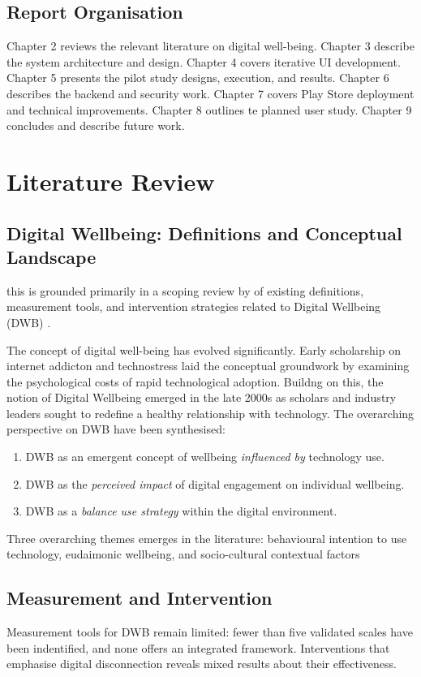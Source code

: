 \documentclass[12pt,a4paper]{report}
\begin{document}
\section{Report Organisation}
Chapter 2 reviews the relevant literature on digital well-being. Chapter 3 describe the system architecture and design. Chapter 4 covers iterative UI development. Chapter 5 presents the pilot study designs, execution, and results. Chapter 6 describes the backend and security work. Chapter 7 covers Play Store deployment and technical improvements. Chapter 8 outlines te planned user study. Chapter 9 concludes and describe future work.

\chapter{Literature Review}
\section{Digital Wellbeing: Definitions and Conceptual Landscape}
this  is grounded primarily in a scoping review by \citep{zhang2022monitoring} of existing definitions, measurement tools, and intervention strategies related to Digital Wellbeing (DWB) .

The concept of digital well-being has evolved significantly. Early scholarship on internet addicton \citep{kraut1998internet} and technostress \citep{tarafdar2007technostress} laid the conceptual groundwork by examining the psychological costs of rapid technological adoption.
Buildng on this, the notion of Digital Wellbeing emerged in the late 2000s as scholars and industry leaders sought to redefine a healthy relationship with technology.
The overarching perspective on DWB have been synthesised:
\begin{enumerate}
    \item DWB as an emergent concept of wellbeing \textit{influenced by} technology use.
    \item DWB as the \textit{perceived impact} of digital engagement on individual wellbeing.
    \item DWB as a \textit{balance use strategy} within the digital environment.
\end{enumerate}

Three overarching themes emerges in the literature: behavioural intention to use technology, eudaimonic wellbeing, and socio-cultural contextual factors \citep{Zhao2024DigitalWellbeing}

\section{Measurement and Intervention}
Measurement tools for DWB remain limited: fewer than five validated scales have been indentified, and none offers an integrated framework. Interventions that emphasise digital disconnection reveals mixed results about their effectiveness.
\end{document}
